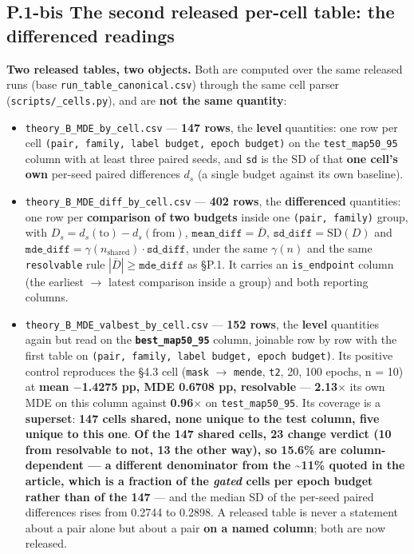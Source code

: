 \documentclass[pdflatex,sn-mathphys-ay]{sn-jnl}
\begin{document}
\subsection*{P.1-bis The second released per-cell table: the differenced readings}

\textbf{Two released tables, two objects.} Both are computed over the same released runs (base \texttt{run\_table\_canonical.csv}) through the same cell parser (\texttt{scripts/\_cells.py}), and are \textbf{not the same quantity}:

\begin{itemize}
\item \texttt{theory\_B\_MDE\_by\_cell.csv} --- \textbf{147 rows}, the \textbf{level} quantities: one row per cell \texttt{(pair, family, label budget, epoch budget)} on the \texttt{test\_map50\_95} column with at least three paired seeds, and \texttt{sd} is the SD of that \textbf{one cell's own} per-seed paired differences $d_s$ (a single budget against its own baseline).
\item \texttt{theory\_B\_MDE\_diff\_by\_cell.csv} --- \textbf{402 rows}, the \textbf{differenced} quantities: one row per \textbf{comparison of two budgets} inside one \texttt{(pair, family)} group, with $D_s=d_s(\text{to})-d_s(\text{from})$, $\texttt{mean\_diff}=\overline D$, $\texttt{sd\_diff}=\mathrm{SD}(D)$ and $\texttt{mde\_diff}=\gamma(n_{\text{shared}})\cdot\texttt{sd\_diff}$, under the same $\gamma(n)$ and the same \texttt{resolvable} rule $|\overline D|\ge\texttt{mde\_diff}$ as \S{}P.1. It carries an \texttt{is\_endpoint} column (the earliest \ensuremath{\rightarrow} latest comparison inside a group) and both reporting columns.
\item \texttt{theory\_B\_MDE\_valbest\_by\_cell.csv} --- \textbf{152 rows}, the \textbf{level} quantities again but read on the \textbf{\texttt{best\_map50\_95}} column, joinable row by row with the first table on \texttt{(pair, family, label budget, epoch budget)}. Its positive control reproduces the \S{}4.3 cell (\texttt{mask} \ensuremath{\rightarrow} \texttt{mende}, \texttt{t2}, 20, 100 epochs, n = 10) at \textbf{mean \ensuremath{-}1.4275 pp, MDE 0.6708 pp, resolvable} --- \textbf{2.13\ensuremath{\times}} its own MDE on this column against \textbf{0.96\ensuremath{\times}} on \texttt{test\_map50\_95}. Its coverage is a \textbf{superset}: \textbf{147 cells shared, none unique to the test column, five unique to this one}. \textbf{Of the 147 shared cells, 23 change verdict (10 from resolvable to not, 13 the other way), so 15.6\% are column-dependent --- a different denominator from the \textasciitilde{}11\% quoted in the article, which is a fraction of the \emph{gated} cells per epoch budget rather than of the 147} --- and the median SD of the per-seed paired differences rises from 0.2744 to 0.2898. A released table is never a statement about a pair alone but about a pair \textbf{on a named column}; both are now released.
\end{itemize}
\end{document}
